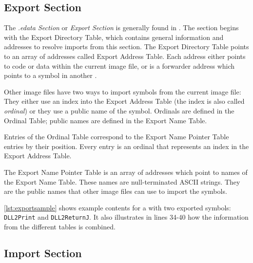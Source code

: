\subsection*{Export Section} \label{subsec:idata}

The \emph{.edata Section} or \emph{Export Section} is generally found in . The section begins with the Export Directory Table, which contains general information and addresses to resolve imports from this section. The Export Directory Table points to an array of addresses called Export Address Table. Each address either points to code or data within the current image file, or is a forwarder address which points to a symbol in another \DLL{}. 

Other image files have two ways to import symbols from the current image file: They either use an index into the Export Address Table (the index is also called \emph{ordinal}) or they use a public name of the symbol. Ordinals are defined in the Ordinal Table; public names are defined in the Export Name Table.

Entries of the Ordinal Table correspond to the Export Name Pointer Table entries by their position. Every entry is an ordinal that represents an index in the Export Address Table.

The Export Name Pointer Table is an array of addresses which point to names of the Export Name Table. These names are null-terminated ASCII strings. They are the public names that other image files can use to import the symbols.

\autoref{lst:exportsample} shows example contents for a \DLL{} with two exported symbols: \texttt{DLL2Print} and \texttt{DLL2ReturnJ}. It also illustrates in lines 34-40 how the information from the different tables is combined.



\subsection*{Import Section}

